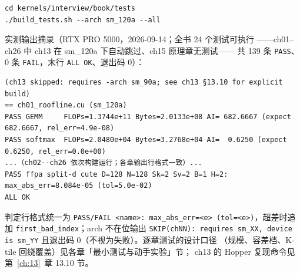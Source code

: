 \begin{lstlisting}[style=console]
cd kernels/interview/book/tests
./build_tests.sh --arch sm_120a --all
\end{lstlisting}

\noindent 实测输出摘录（RTX PRO 5000，2026-09-14；全书 24 个测试可执行
——ch01--ch26 中 ch13 在 sm\_120a 下自动跳过、ch15 原理章无测试——
共 139 条 \texttt{PASS}、0 条 \texttt{FAIL}，末行 \texttt{ALL~OK}、退出码 0）：

\begin{lstlisting}[style=console]
(ch13 skipped: requires -arch sm_90a; see ch13 §13.10 for explicit build)
== ch01_roofline.cu (sm_120a)
PASS GEMM     FLOPs=1.3744e+11 Bytes=2.0133e+08 AI= 682.6667 (expect  682.6667, rel_err=4.9e-08)
PASS softmax  FLOPs=2.0480e+04 Bytes=3.2768e+04 AI=  0.6250 (expect    0.6250, rel_err=0.0e+00)
...（ch02--ch26 依次构建运行；各章输出行格式一致）...
PASS ffpa split-d cute D=128 N=128 Sk=2 Sv=2 B=1 H=2: max_abs_err=8.084e-05 (tol=5.0e-02)
ALL OK
\end{lstlisting}

\noindent 判定行格式统一为
\texttt{PASS/\allowbreak{}FAIL \allowbreak{}<name>: max\_\allowbreak{}abs\_\allowbreak{}err=\allowbreak{}<e> \allowbreak{}(tol=\allowbreak{}<e>)}，超差时追加
\texttt{first\_\allowbreak{}bad\_\allowbreak{}index}；arch 不在位输出 \texttt{SKIP(chNN): requires
sm\_XX, device is sm\_YY} 且退出码 0（不视为失败）。逐章测试的设计口径
（规模、容差档、K-tile 回绕覆盖）见各章「最小测试与动手实验」节；
ch13 的 Hopper 复现命令见第~\ref{ch:13}~章 13.10 节。
